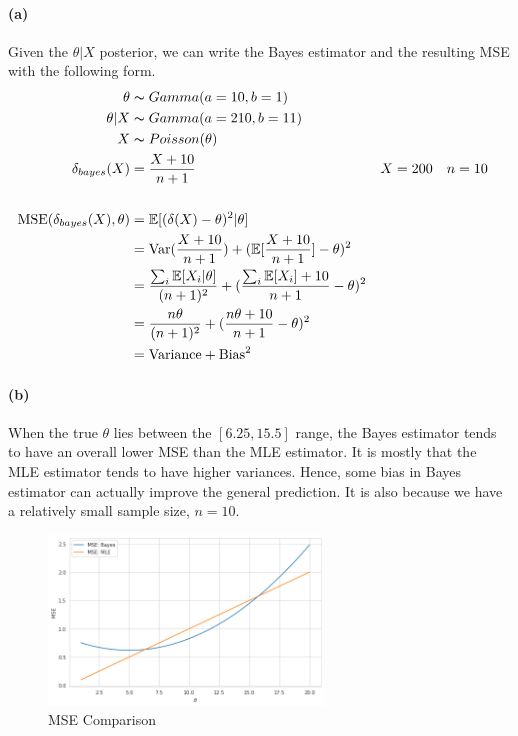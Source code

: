 \documentclass[11pt, letterpaper]{article}
\begin{document}
\paragraph{(a)}
Given the $\theta|X$ posterior, we can write the Bayes estimator and the resulting MSE with the following form.
\begin{align*}
    \theta &\thicksim Gamma(a=10, b=1) \\
    \theta|X &\thicksim Gamma(a=210, b=11) \\
    X &\thicksim Poisson(\theta) \\
    \delta_{bayes}(X) &= \frac{X+10}{n+1} && X=200 \quad n=10 \\ \\ 
    \text{MSE}(\delta_{bayes}(X), \theta) &= \mathbb{E}[(\delta(X) - \theta)^2|\theta] \\
        &= \text{Var}(\frac{X+10}{n+1}) + (\mathbb{E}[\frac{X+10}{n+1}] - \theta)^2 \\
        &= \frac{\sum_i \mathbb{E}[X_i|\theta]}{(n+1)^2} + (\frac{\sum_i \mathbb{E}[X_i] + 10}{n+1} - \theta)^2\\
        &= \frac{n\theta}{(n+1)^2} + (\frac{n\theta + 10}{n+1} - \theta)^2 \\
        &= \text{Variance} + \text{Bias}^2
\end{align*}

\paragraph{(b)}
When the true $\theta$ lies between the $[6.25, 15.5]$ range, the Bayes estimator tends to have an overall lower MSE than the MLE estimator. It is mostly that the MLE estimator tends to have higher variances. Hence, some bias in Bayes estimator can actually improve the general prediction. It is also because we have a relatively small sample size, $n = 10$.

\begin{figure}[!h]
  \centering
  \includegraphics[width=0.65\textwidth]{2.a.png}
  \captionsetup{justification=centering}
  \caption{MSE Comparison}
\end{figure}
\end{document}
